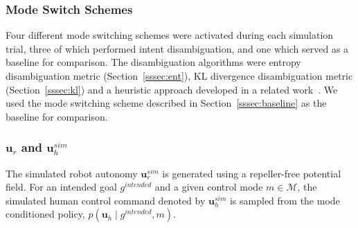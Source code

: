 \documentclass[letterpaper, 10 pt, conference]{ieeeconf}  %
\newcommand{\argmax}{\arg\!\max}
\begin{document}
\subsubsection{Mode Switch Schemes}
Four different mode switching schemes were activated during each simulation trial, three of which performed intent disambiguation, and one which served as a baseline for comparison. The disambiguation algorithms were entropy disambiguation  metric (Section~\ref{sssec:ent}), KL divergence disambiguation metric (Section~\ref{sssec:kl}) and a heuristic approach developed in a related work~\cite{gopinath2017mode}. We used the mode switching scheme described in Section~\ref{sssec:baseline} as the baseline for comparison. 
\subsubsection{$\boldsymbol{u}_r$ and $\boldsymbol{u}_h^{sim}$}
The simulated robot autonomy $\boldsymbol{u}^{sim}_r$ is generated using a repeller-free potential field. For an intended goal $g^{intended}$ and a given control mode $m \in \mathcal{M}$, the simulated human control command denoted by $\boldsymbol{u}^{sim}_h$ is sampled from the mode conditioned policy, $p(\boldsymbol{u}_h\;|\;g^{intended}, m)$. 
\end{document}

